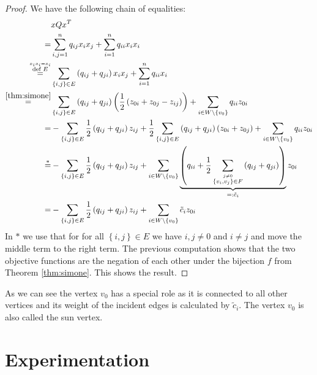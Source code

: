\documentclass[12pt,a4paper]{article}
\theoremstyle{mythm}
\begin{document}
\begin{proof}
We have the following chain of equalities:
\begin{align*}
&x Q x ^T \\
=& \sum_{ i,j = 1 }^{ n } q _{ ij } x_i x_j + \sum_{ i = 1 }^{ n } q _{ ii } x_i x_{ i } \\
\overset{ \overset{ x_i x_i = x_i  }{ \text{def } E} }{ =}&  \sum_{ \left\{ i,j \right\} \in E  }^{  } \left( q _{ ij } + q _{ ji } \right) x_i x_j + \sum_{ i = 1 }^{ n } q
_{ ii } x_i \\
\overset{ \ref{thm:simone}  }{ =}& \sum_{ \left\{ i,j \right\} \in E  }^{  } \left( q _{ ij } + q _{ ji }  \right) \left( \frac{ 1 }{ 2 } \left( z _{ 0i } + z _{ 0j } - z _{
ij }  \right)  \right) + \sum_{ i \in W \setminus \left\{ v_0 \right\}   }^{  } q _{ ii } z _{ 0i } \\
=& -  \sum_{ \left\{ i,j \right\} \in E  }^{  } \frac{ 1 }{ 2 } \left( q _{ ij } + q _{ ji }  \right) z _{ ij } + 
\frac{ 1 }{ 2 } \sum_{  \left\{ i,j \right\}  \in E }^{ } \left( q _{ ij } +
q _{ ji }  \right) \left(  z _{ 0i } + z _{ 0j } \right) + \sum_{ i \in W \setminus \left\{ v_0 \right\}   }^{  } q _{ ii } z _{ 0i } \\
\overset{ \ast}{ =} & - \sum_{ \left\{ i,j \right\} \in E }^{  } \frac{ 1 }{ 2 } \left( q _{ ij } + q _{ ji }  \right) z _{ ij } + 
\sum_{ i \in W \setminus \left\{ v_0 \right\}   }^{  } \underbrace{ \left( q _{ ii } + \frac{ 1 }{ 2 } \sum_{ \overset{ j \neq 0  }{ \left\{ v_i , v_j \right\} \in F} }^{  }  \left( q _{
ij } + q _{ ji }  \right) \right) }_{ =: \tilde{ c } _i }  z _{ 0i } \\
=& - \sum_{ \left\{ i,j \right\} \in E }^{  } \frac{ 1 }{ 2 } \left( q _{ ij } + q _{ ji }  \right) z _{ ij } + 
\sum_{ i \in W \setminus \left\{ v_0 \right\}   }^{  } \tilde{ c } _i   z _{ 0i } 
\end{align*} 
In $ \ast $ we use that for for all $ \left\{ i,j \right\} \in E $ we have $ i,j \neq 0  $ and $ i \neq j  $ and move the middle term to the right term.
The previous computation shows that the two objective functions are the negation of each other under the bijection $ f $ from Theorem \ref{thm:simone}.
This shows the result.
\end{proof}
As we can see the vertex $ v_0 $ has a special role as it is connected to all other vertices and its weight of the incident edges is calculated by $ \widetilde{ c } _{ i }  $.
The vertex $ v_0 $ is also called the sun vertex.

\section{Experimentation}
\label{sec:expermints} 
\end{document}
